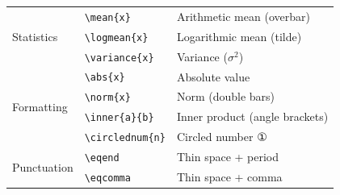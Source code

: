 \begin{table}[htbp]
\begin{tabular}{@{}llp{}@{}}
    \midrule
    \multirow{3}{*}{Statistics}
      & \texttt{\textbackslash mean\{x\}}       & Arithmetic mean (overbar) \\
      & \texttt{\textbackslash logmean\{x\}}    & Logarithmic mean (tilde) \\
      & \texttt{\textbackslash variance\{x\}}   & Variance ($\sigma^2$) \\
    \midrule
    \multirow{4}{*}{Formatting}
      & \texttt{\textbackslash abs\{x\}}       & Absolute value \\
      & \texttt{\textbackslash norm\{x\}}      & Norm (double bars) \\
      & \texttt{\textbackslash inner\{a\}\{b\}} & Inner product (angle brackets) \\
      & \texttt{\textbackslash circlednum\{n\}} & Circled number ① \\
    \midrule
    \multirow{2}{*}{Punctuation}
      & \texttt{\textbackslash eqend}           & Thin space + period \\
      & \texttt{\textbackslash eqcomma}         & Thin space + comma \\
    \bottomrule
  \end{tabular}
\end{table}
